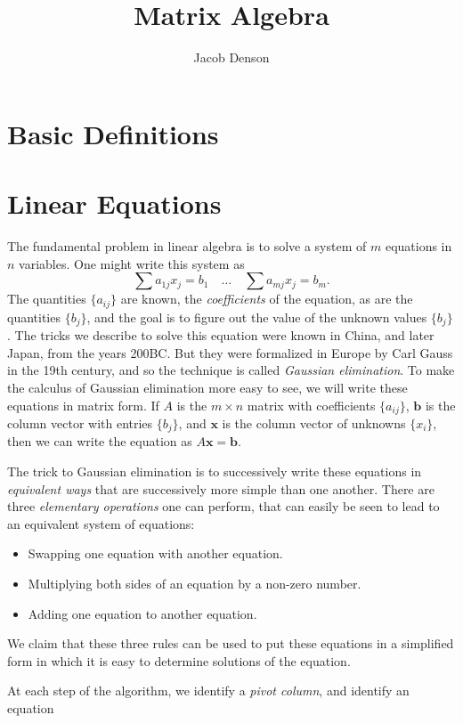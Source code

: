 

\title{Matrix Algebra}
\author{Jacob Denson}



\maketitle
\tableofcontents

\chapter{Basic Definitions}


\chapter{Linear Equations}

The fundamental problem in linear algebra is to solve a system of $m$ equations in $n$ variables. One might write this system as
%
\[ \sum a_{1j} x_j = b_1 \quad \dots \quad \sum a_{mj} x_j = b_m. \]
%
The quantities $\{ a_{ij} \}$ are known, the \emph{coefficients} of the equation, as are the quantities $\{ b_j \}$, and the goal is to figure out the value of the unknown values $\{ b_j \}$. The tricks we describe to solve this equation were known in China, and later Japan, from the years 200BC. But they were formalized in Europe by Carl Gauss in the 19th century, and so the technique is called \emph{Gaussian elimination}. To make the calculus of Gaussian elimination more easy to see, we will write these equations in matrix form. If $A$ is the $m \times n$ matrix with coefficients $\{ a_{ij} \}$, $\mathbf{b}$ is the column vector with entries $\{ b_j \}$, and $\mathbf{x}$ is the column vector of unknowns $\{ x_i \}$, then we can write the equation as $A\mathbf{x} = \mathbf{b}$.

The trick to Gaussian elimination is to successively write these equations in \emph{equivalent ways} that are successively more simple than one another. There are three \emph{elementary operations} one can perform, that can easily be seen to lead to an equivalent system of equations:
%
\begin{itemize}
    \item Swapping one equation with another equation.
    \item Multiplying both sides of an equation by a non-zero number.
    \item Adding one equation to another equation.
\end{itemize}
%
We claim that these three rules can be used to put these equations in a simplified form in which it is easy to determine solutions of the equation.

At each step of the algorithm, we identify a \emph{pivot column}, and identify an equation

